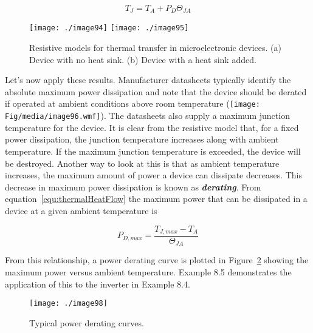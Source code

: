 \begin{equation}
\label{equ:thermalHeatFlow}
T_J = T_A + P_D \Theta_{JA}
\end{equation}

\begin{figure}
\texttt{[image: ./image94]}
\texttt{[image: ./image95]}
\caption{Resistive models for thermal transfer in
microelectronic devices. (a) Device with no heat sink. (b) Device with a
heat sink added.}
\label{figure:thermalModelAsCircuit}
\end{figure}

Let's now apply these results. Manufacturer datasheets typically
identify the absolute maximum power dissipation and note that the device
should be derated if operated at ambient conditions above room
temperature (\texttt{[image: Fig/media/image96.wmf]}). The datasheets
also supply a maximum junction temperature for the device. It is clear
from the resistive model that, for a fixed power dissipation, the
junction temperature increases along with ambient temperature. If the
maximum junction temperature is exceeded, the device will be destroyed.
Another way to look at this is that as ambient temperature increases,
the maximum amount of power a device can dissipate decreases. This
decrease in maximum power dissipation is known as
\emph{\textbf{derating}}. From equation~\ref{equ:thermalHeatFlow}
 the maximum power that can be
dissipated in a device at a given ambient temperature is

\begin{equation}
\label{equ:powerFunctionTemperature}
P_{D,max} = \frac{T_{J,max}  - T_A}{\Theta_{JA}}
\end{equation}

From this relationship, a power derating curve is plotted in 
Figure~\ref{figure:typicalDeratingCurve}
showing the maximum power versus ambient temperature. Example 8.5
demonstrates the application of this to the inverter in Example 8.4.

\begin{figure}
\texttt{[image: ./image98]}
\caption{Typical power derating curves.}
\label{figure:typicalDeratingCurve}
\end{figure}

